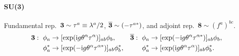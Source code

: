 \documentclass[CheatSheet]{subfiles}
\begin{document}
\paragraph{SU(3)} Fundamental rep.~$\mathbf{3}\sim\tau^a\equiv \lambda^a/2$, $\overline{\mathbf{3}}\sim(-\tau^{a*})$, and adjoint rep.~$\symbf8\sim (f^a)^{bc}$.
\begin{align}\notag
\mathbf{3}:~\phi_a&
  \to [\exp({\mathrm{i}} g \theta^\alpha \tau^\alpha)]_{ab}\phi_b,
&
\overline{\mathbf{3}}:~\phi_a&
  \to[\exp(-{\mathrm{i}} g \theta^\alpha \tau^{\alpha*})]_{ab}\phi_b,
\\
\phi_a^*&
  \to[\exp(-{\mathrm{i}} g \theta^\alpha \tau^{\alpha*})]_{ab}\phi_b^*,
&
\phi_a^*&
  \to[\exp({\mathrm{i}} g \theta^\alpha \tau^{\alpha})]_{ab}\phi_b^*.
\end{align}

\clearpage
\detailstyle
\end{document}
